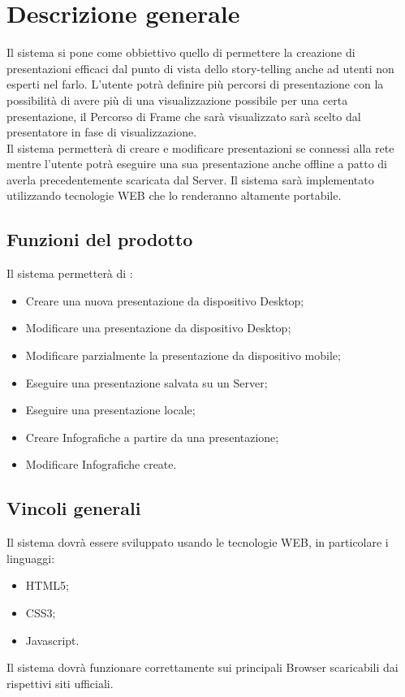 \section{Descrizione generale}{
Il sistema si pone come obbiettivo quello di permettere la creazione di presentazioni efficaci dal punto di vista dello story-telling anche ad utenti non esperti nel farlo.
L'utente potrà definire più percorsi di presentazione con la possibilità di avere più di una visualizzazione possibile per una certa presentazione, il Percorso di Frame che sarà visualizzato sarà scelto dal presentatore in fase di visualizzazione.\\
Il sistema permetterà di creare e modificare presentazioni se connessi alla rete mentre l'utente potrà eseguire una sua presentazione anche offline a patto di averla precedentemente scaricata dal Server.
Il sistema sarà implementato utilizzando tecnologie WEB che lo renderanno altamente portabile.

\subsection{Funzioni del prodotto}{
	Il sistema permetterà di :
	\begin{itemize}
		\item Creare una nuova presentazione da dispositivo Desktop;
		\item Modificare una presentazione da dispositivo Desktop;
		\item Modificare parzialmente la presentazione da dispositivo mobile;
		\item Eseguire una presentazione salvata su un Server;
		\item Eseguire una presentazione locale;
		\item Creare Infografiche a partire da una presentazione;
		\item Modificare Infografiche create.
	\end{itemize}
}
\subsection{Vincoli generali}{
	Il sistema dovrà essere sviluppato usando le tecnologie WEB, in particolare i linguaggi:
	\begin{itemize}
		\item HTML5;
		\item CSS3;
		\item Javascript.
	\end{itemize}
	
	\noindent
	Il sistema dovrà funzionare correttamente sui principali Browser scaricabili dai rispettivi siti ufficiali.
	}
}